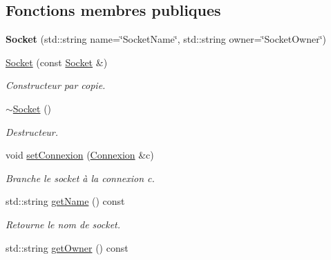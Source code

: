 \subsection*{Fonctions membres publiques}
\begin{DoxyCompactItemize}
\item 
\hypertarget{classSocket_a0365662f7a20fa1cc6ef54fd2a659cfc}{{\bfseries Socket} (std\-::string name=\char`\"{}Socket\-Name\char`\"{}, std\-::string owner=\char`\"{}Socket\-Owner\char`\"{})}\label{classSocket_a0365662f7a20fa1cc6ef54fd2a659cfc}

\item 
\hypertarget{classSocket_a0dd97f1387c3bd8008cb7de47583a985}{\hyperlink{classSocket_a0dd97f1387c3bd8008cb7de47583a985}{Socket} (const \hyperlink{classSocket}{Socket} \&)}\label{classSocket_a0dd97f1387c3bd8008cb7de47583a985}

\begin{DoxyCompactList}\small\item\em Constructeur par copie. \end{DoxyCompactList}\item 
\hypertarget{classSocket_aeac4eb6379a543d38ed88977d3b6630a}{\hyperlink{classSocket_aeac4eb6379a543d38ed88977d3b6630a}{$\sim$\-Socket} ()}\label{classSocket_aeac4eb6379a543d38ed88977d3b6630a}

\begin{DoxyCompactList}\small\item\em Destructeur. \end{DoxyCompactList}\item 
\hypertarget{classSocket_a96d104e32d5f376796fb411874954e7d}{void \hyperlink{classSocket_a96d104e32d5f376796fb411874954e7d}{set\-Connexion} (\hyperlink{classConnexion}{Connexion} \&c)}\label{classSocket_a96d104e32d5f376796fb411874954e7d}

\begin{DoxyCompactList}\small\item\em Branche le socket à la connexion c. \end{DoxyCompactList}\item 
\hypertarget{classSocket_ab6f399ca94b2b6a916d7fd812e40e16b}{std\-::string \hyperlink{classSocket_ab6f399ca94b2b6a916d7fd812e40e16b}{get\-Name} () const }\label{classSocket_ab6f399ca94b2b6a916d7fd812e40e16b}

\begin{DoxyCompactList}\small\item\em Retourne le nom de socket. \end{DoxyCompactList}\item 
\hypertarget{classSocket_a46fb0e8171c4797922081ee03b1a6b38}{std\-::string \hyperlink{classSocket_a46fb0e8171c4797922081ee03b1a6b38}{get\-Owner} () const }\label{classSocket_a46fb0e8171c4797922081ee03b1a6b38}


\end{DoxyCompactItemize}
